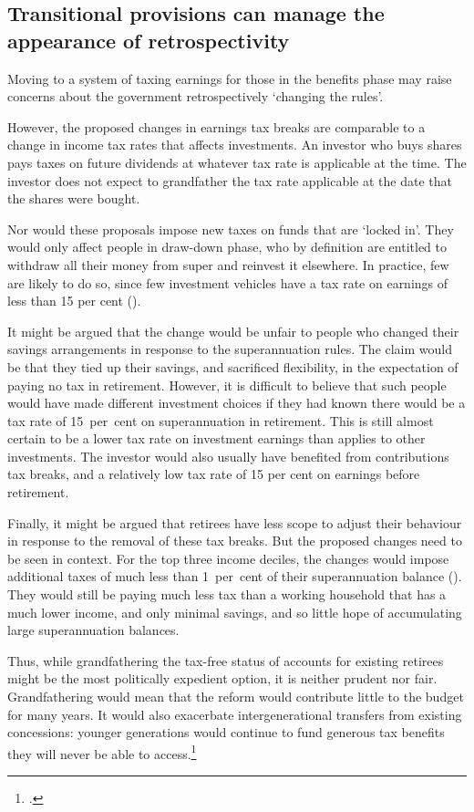 \subsection{Transitional provisions can manage the appearance of retrospectivity}\label{sec:SUPER-6-5}
Moving to a system of taxing earnings for those in the benefits phase may raise concerns about the government retrospectively ‘changing the rules’. 

However, the proposed changes in earnings tax breaks are comparable to a change in income tax rates that affects investments. An investor who buys shares pays taxes on future dividends at whatever tax rate is applicable at the time. The investor does not expect to grandfather the tax rate applicable at the date that the shares were bought. 

Nor would these proposals impose new taxes on funds that are ‘locked in’. They would only affect people in draw-down phase, who by definition are entitled to withdraw all their money from super and reinvest it elsewhere. In practice, few are likely to do so, since few investment vehicles have a tax rate on earnings of less than 15 per cent ().

It might be argued that the change would be unfair to people who changed their savings arrangements in response to the superannuation rules. The claim would be that they tied up their savings, and sacrificed flexibility, in the expectation of paying no tax in retirement. However, it is difficult to believe that such people would have made different investment choices if they had known there would be a tax rate of 15~per~cent on superannuation in retirement. This is still almost certain to be a lower tax rate on investment earnings than applies to other investments. The investor would also usually have benefited from contributions tax breaks, and a relatively low tax rate of 15 per cent on earnings before retirement.

Finally, it might be argued that retirees have less scope to adjust their behaviour in response to the removal of these tax breaks. But the proposed changes need to be seen in context. For the top three income deciles, the changes would impose additional taxes of much less than 1~per~cent of their superannuation balance (). They would still be paying much less tax than a working household that has a much lower income, and only minimal savings, and so little hope of accumulating large superannuation balances. 

Thus, while grandfathering the tax-free status of accounts for existing retirees might be the most politically expedient option, it is neither prudent nor fair. Grandfathering would mean that the reform would contribute little to the budget for many years. It would also exacerbate intergenerational transfers from existing concessions: younger generations would continue to fund generous tax benefits they will never be able to access.\footcite[][47]{DaleyWoodWeidmannEtAl2014}  

